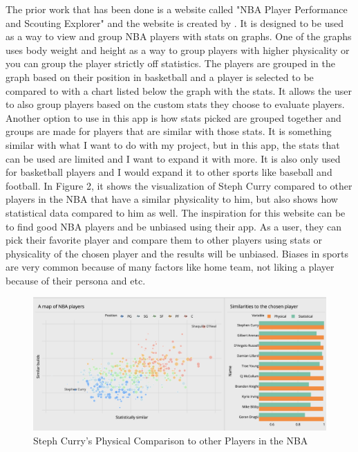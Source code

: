 \documentclass[10pt,twocolumn]{article}
\begin{document}
The prior work that has been done is a website called "NBA Player Performance and Scouting Explorer" and the website is created by \textcite{dash}.
It is designed to be used as a way to view and group NBA players with stats on graphs. One of the graphs uses body weight and height as a way to group players with higher physicality or you can group the player strictly off statistics. The players are grouped in the graph based on their position in basketball and a player is selected to be compared to with a chart listed below the graph with the stats. It allows the user to also group players based on the custom stats they choose to evaluate players. Another option to use in this app is how stats picked are grouped together and groups are made for players that are similar with those stats. It is something similar with what I want to do with my project, but in this app, the stats that can be used are limited and I want to expand it with more. It is also only used for basketball players and I would expand it to other sports like baseball and football. In Figure 2, it shows the visualization of Steph Curry compared to other players in the NBA that have a similar physicality to him, but also shows how statistical data compared to him as well. The inspiration for this website can be to find good NBA players and be unbiased using their app. As a user, they can pick their favorite player and compare them to other players using stats or physicality of the chosen player and the results will be unbiased. Biases in sports are very common because of many factors like home team, not liking a player because of their persona and etc.

\begin{figure}
    \centering
    \includegraphics[width=.98\linewidth]{Steph_Comparisons.png}
    \caption{
        Steph Curry's Physical Comparison to other Players in the NBA 
    }
    \label{fig:second-page}
\end{figure}
\end{document}
